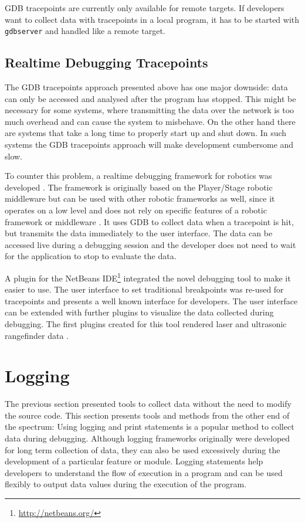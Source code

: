 GDB tracepoints are currently only available for remote targets. If developers want to collect data with tracepoints in a local program, it has to be started with \verb+gdbserver+ and handled like a remote target.

\subsection{Realtime Debugging Tracepoints}
\label{realtime_debugging}
The GDB tracepoints approach presented above has one major downside: data can only be accessed and analysed after the program has stopped. This might be necessary for some systems, where transmitting the data over the network is too much overhead and can cause the system to misbehave. On the other hand there are systems that take a long time to properly start up and shut down. In such systems the GDB tracepoints approach will make development cumbersome and slow.

To counter this problem, a realtime debugging framework for robotics was developed \cite{Gumbley2009}. The framework is originally based on the Player/Stage robotic middleware but can be used with other robotic frameworks as well, since it operates on a low level and does not rely on specific features of a robotic framework or middleware \cite{Gumbley2009}. It uses GDB to collect data when a tracepoint is hit, but transmits the data immediately to the user interface. The data can be accessed live during a debugging session and the developer does not need to wait for the application to stop to evaluate the data.

A plugin for the NetBeans IDE\footnote{\url{http://netbeans.org/}} integrated the novel debugging tool to make it easier to use. The user interface to set traditional breakpoints was re-used for tracepoints and presents a well known interface for developers. The user interface can be extended with further plugins to visualize the data collected during debugging. The first plugins created for this tool rendered laser and ultrasonic rangefinder data \cite{Gumbley2009}.




\section{Logging}
The previous section presented tools to collect data without the need to modify the source code. This section presents tools and methods from the other end of the spectrum: Using logging and print statements is a popular method to collect data during debugging. Although logging frameworks originally were developed for long term collection of data, they can also be used excessively during the development of a particular feature or module. Logging statements help developers to understand the flow of execution in a program and can be used flexibly to output data values during the execution of the program.

